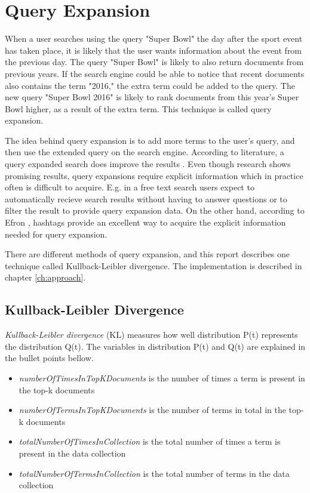 \section{Query Expansion}
\label{sec:query-expansion}
When a user searches using the query "Super Bowl" the day after the sport event has taken place,
it is likely that the user wants information about the event from the previous day.
The query "Super Bowl" is likely to also return documents from previous years.
If the search engine could be able to notice that recent documents also contains the term "2016,"
the extra term could be added to the query.
The new query "Super Bowl 2016" is likely to rank documents from this year's Super Bowl higher, as a result of the extra term.
This technique is called query expansion.

The idea behind query expansion is to add more terms to the user's query, and then use the extended query on the search engine.
According to literature, a query expanded search does improve the results \cite[ch. 5]{ir-book}.
Even though research shows promising results, query expansions require explicit information which in practice often is difficult to acquire.
E.g. in a free text search users expect to automatically recieve search results without having to answer questions or to filter the result to provide query expansion data.
On the other hand, according to Efron \cite{ir-hashtag}, hashtags provide an excellent way to acquire the explicit information needed for query expansion.

There are different methods of query expansion, and this report describes one technique called Kullback-Leibler divergence.
The implementation is described in chapter \ref{ch:approach}.

\subsection{Kullback-Leibler Divergence}
\textit{Kullback-Leibler divergence} (KL) measures how well distribution P(t) represents the distribution Q(t).
The variables in distribution P(t) and Q(t) are explained in the bullet points bellow.

\begin{itemize}
	\item \textit{numberOfTimesInTopKDocuments} is the number of times a term is present in the top-k documents
	\item \textit{numberOfTermsInTopKDocuments} is the number of terms in total in the top-k documents
	\item \textit{totalNumberOfTimesInCollection} is the total number of times a term is present in the data collection
	\item \textit{totalNumberOfTermsInCollection} is the total number of terms in the data collection
\end{itemize}

